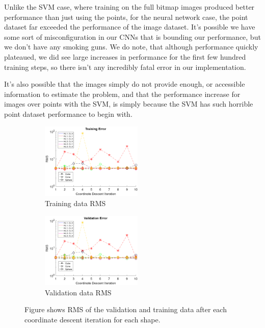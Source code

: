 \documentclass[journal]{IEEEtran}
\begin{document}
Unlike the SVM case, where training on the full bitmap images produced better performance than just using the points, for the neural network case, the point dataset far exceeded the performance of the image dataset. It's possible we have some sort of misconfiguration in our CNNs that is bounding our performance, but we don't have any smoking guns. We do note, that although performance quickly plateaued, we did see large increases in performance for the first few hundred training steps, so there isn't any incredibly fatal error in our implementation.

It's also possible that the images simply do not provide enough, or accessible information to estimate the problem, and that the performance increase for images over points with the SVM, is simply because the SVM has such horrible point dataset performance to begin with.

\begin{figure}
	\hspace{-1 ex}
	\begin{subfigure}{.3\textwidth}
		\centering
		\includegraphics[width=1.9in]{train_coord_descent_plot}
		\caption{Training data RMS}
		\label{fig:train_coord_desc}
	\end{subfigure}%
	\begin{subfigure}{.3\textwidth}
		\centering
		\includegraphics[width=1.9in]{val_coord_descent_plot}
		\caption{Validation data RMS}
		\label{fig:val_coord_desc}
	\end{subfigure}
	\caption{Figure shows RMS of the validation and training data after each coordinate descent iteration for each shape.}
	\label{Fig:coordDescent}
\end{figure}
\end{document}
